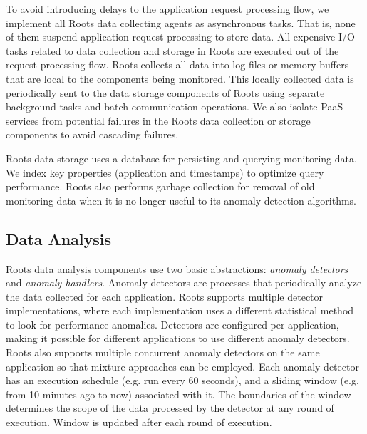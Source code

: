 To avoid introducing delays to the application request processing flow, we implement
all Roots data collecting agents as asynchronous tasks. That is, none of them 
suspend application request processing to store data.
All expensive I/O tasks related to data collection and storage in Roots are
executed out of the request processing flow.
Roots collects all data into log files or memory buffers that are local to the components being
monitored. This locally collected data is periodically sent
to the data storage components of Roots using separate background tasks and batch communication
operations. We also isolate PaaS services from potential
failures in the Roots data collection or storage components to avoid cascading failures.

Roots data storage uses a database for persisting and querying monitoring data.
We index key properties (application and timestamps) to optimize query performance.
Roots also performs garbage collection for removal of 
old monitoring data when it is no longer useful 
to its anomaly detection algorithms. 

\subsection{Data Analysis}

Roots data analysis components use two basic abstractions: \textit{anomaly detectors} 
and \textit{anomaly handlers}.
Anomaly detectors are processes that periodically analyze the data collected for
each application. Roots supports multiple detector implementations, where each implementation
uses a different statistical method to look for performance anomalies. Detectors are configured
per-application, making it possible for different applications to use different anomaly 
detectors. Roots also supports multiple concurrent anomaly detectors 
on the same application so that mixture approaches can be employed.
Each anomaly detector has an execution schedule (e.g. run every 60 seconds), and a sliding window 
(e.g. from 10 minutes ago to now)
associated with it. The boundaries of the window determines the scope
of the data processed by the detector at any round of execution. Window is updated 
after each round of execution. 

